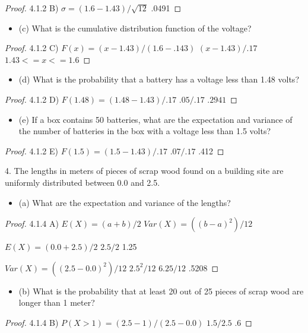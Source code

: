 \documentclass{article}
\begin{document}
\begin{enumerate}
\begin{proof}
4.1.2 B)
$\sigma = (1.6-1.43)/\sqrt{12}$
.0491
    \end{proof}
        \begin{itemize}
            \item (c) What is the cumulative distribution function of the voltage?
        \end{itemize}
    \begin{proof}
4.1.2 C)
$F(x) = (x-1.43)/(1.6-.143)$
$(x-1.43)/.17$
$1.43<=x<=1.6$
    \end{proof}
        \begin{itemize}
            \item (d) What is the probability that a battery has a voltage less than 1.48 volts?
        \end{itemize}
    \begin{proof}
4.1.2 D)
$F(1.48) = (1.48-1.43)/.17$
$.05/.17$
$.2941$
    \end{proof}
        \begin{itemize}
            \item (e) If a box contains 50 batteries, what are the expectation and variance of the number of batteries in the box with a voltage less than 1.5 volts?
        \end{itemize}
    \begin{proof}
4.1.2 E)
$F(1.5) = (1.5-1.43)/.17$
$.07/.17$
.412
    \end{proof}
        
4. The lengths in meters of pieces of scrap wood found on a building site are uniformly distributed between 0.0 and 2.5.
    \begin{itemize}
            \item (a) What are the expectation and variance of the lengths?
    \end{itemize}
    \begin{proof}
4.1.4 A)
$E(X) = (a+b)/2$
$Var(X) = ((b-a)^{2})/12$

$E(X) = (0.0 + 2.5)/2$
$2.5/2$
1.25

$Var(X) = ((2.5 - 0.0)^{2})/12$
$2.5^{2}/12$
$6.25/12$
.5208    \end{proof}
        \begin{itemize}
            \item (b) What is the probability that at least 20 out of 25 pieces of scrap wood are longer than 1 meter?
        \end{itemize}
    \begin{proof}
4.1.4 B)
$P(X>1) = (2.5 - 1)/(2.5 - 0.0)$
$1.5/2.5$
.6
   

\end{proof}
\end{enumerate}
\end{document}
